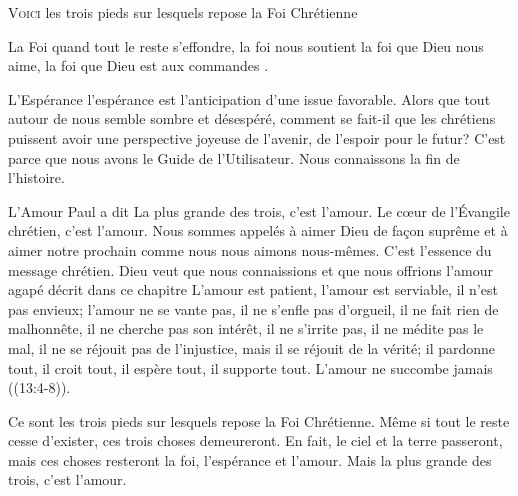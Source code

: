 

\lettrine[lhang=0.8]{V}{oici} les trois pieds sur lesquels
 repose la Foi Chrétienne\frcolon{}

La Foi \ocadr quand tout le reste s'effondre, la foi nous soutient \fcadr{}
 la foi que Dieu nous aime, la foi que Dieu est \Og aux commandes \Fg{}.

L'Espérance \ocadr l'espérance est l'anticipation d'une issue favorable.
 Alors que tout autour de nous semble sombre et désespéré,
 comment se fait-il que les chrétiens puissent avoir une perspective
 joyeuse de l'avenir, de l'espoir pour le futur?
 C'est parce que nous avons le Guide de l'Utilisateur.
 Nous connaissons la fin de l'histoire.


L'Amour \ocadr Paul a dit\frcolon{} 
 \Og La plus grande des trois, c'est l'amour. \Fg{}
 Le c\oe{}ur de l'Évangile chrétien, c'est l'amour.
 Nous sommes appelés à aimer Dieu de fa\c{c}on suprême
 et à aimer notre prochain comme nous nous aimons nous-mêmes.
 C'est l'essence du message chrétien.
 Dieu veut que nous connaissions et que nous offrions
 l'amour \Og agapé \Fg{} décrit dans ce chapitre\frcolon{}
 \Og L'amour est patient, l'amour est serviable,
 il n'est pas envieux; l'amour ne se vante pas,
 il ne s'enfle pas d'orgueil, il ne fait rien de malhonnête,
 il ne cherche pas son intérêt, il ne s'irrite pas,
 il ne médite pas le mal, il ne se réjouit pas de l'injustice,
 mais il se réjouit de la vérité;
 il pardonne tout, il croit tout, il espère tout,
 il supporte tout. L'amour ne succombe jamais \Fg{}
 ((13:4-8)). 

Ce sont les trois pieds sur lesquels repose la Foi Chrétienne. 
 Même si tout le reste cesse d'exister, ces trois choses demeureront.
 En fait, le ciel et la terre passeront, mais ces choses resteront\frcolon{}
 la foi, l'espérance et l'amour.
 Mais la plus grande des trois, c'est l'amour.

\dvrule



